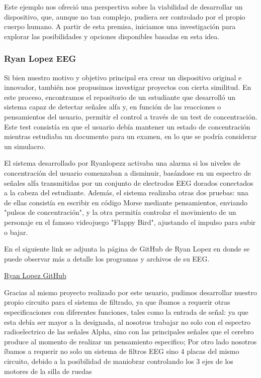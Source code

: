 \documentclass{article}
\begin{document}
Este ejemplo nos ofreció una perspectiva sobre la viabilidad de desarrollar un dispositivo, que, aunque no tan complejo, pudiera ser controlado por el propio cuerpo humano. A partir de esta premisa, iniciamos una investigación para explorar las posibilidades y opciones disponibles basadas en esta idea.


\subsubsection{Ryan Lopez EEG}
Si bien nuestro motivo y objetivo principal era crear un dispositivo original e innovador, también nos propusimos investigar proyectos con cierta similitud. En este proceso, encontramos el repositorio de un estudiante que desarrolló un sistema capaz de detectar señales alfa y, en función de las reacciones o pensamientos del usuario, permitir el control a través de un test de concentración. Este test consistía en que el usuario debía mantener un estado de concentración mientras estudiaba un documento para un examen, en lo que se podría considerar un simulacro.


El sistema desarrollado por Ryanlopezz activaba una alarma si los niveles de concentración del usuario comenzaban a disminuir, basándose en un espectro de señales alfa transmitidas por un conjunto de electrodos EEG dorados conectados a la cabeza del estudiante. Además, el sistema realizaba otras dos pruebas: una de ellas consistía en escribir en código Morse mediante pensamientos, enviando "pulsos de concentración", y la otra permitía controlar el movimiento de un personaje en el famoso videojuego "Flappy Bird", ajustando el impulso para subir o bajar.

En el siguiente link se adjunta la página de GitHub de Ryan Lopez en donde se puede observar más a detalle los programas y archivos de su EEG.


\begin{center}
    \href{https://github.com/ryanlopezzzz/EEG}{Ryan Lopez GitHub}
\end{center}


Gracias al mismo proyecto realizado por este usuario, pudimos desarrollar nuestro propio circuito para el sistema de filtrado, ya que íbamos a requerir otras especificaciones con diferentes funciones, tales como la entrada de señal: ya que esta debía ser mayor a la designada, al nosotros trabajar no solo con el espectro radioelectrico de las señales Alpha, sino con las principales señales que el cerebro produce al momento de realizar un pensamiento especifico; Por otro lado nosotros íbamos a requerir no solo un sistema de filtros EEG sino 4 placas del mismo circuito, debido a la posibilidad de maniobrar controlando los 3 ejes de los motores de la silla de ruedas
\end{document}
